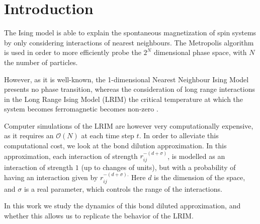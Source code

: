 \section{Introduction}%
\label{sec:Introduction}

The Ising model \cite{ising1925beitrag} is able to explain the spontaneous magnetization of spin systems by only considering interactions of nearest neighbours. The Metropolis \cite{Metropolis1953} algorithm is used in order to more efficiently probe the $2^N$ dimensional phase space, with $N$ the number of particles.

However, as it is well-known, the 1-dimensional Nearest Neighbour Ising Model presents no phase transition, whereas the consideration of long range interactions in the Long Range Ising Model (LRIM) the critical temperature at which the system becomes ferromagnetic becomes non-zero \cite{Janke2023}.

Computer simulations of the LRIM are however very computationally expensive, as it requires an $\mathcal{O}(N)$ at each time step $t $.  In order to alleviate this computational cost, we look at the bond dilution approximation. In this approximation, each interaction of strength $r_{ij}^{-(d + \sigma)}$, is modelled as an interaction of strength $1$ (up to changes of units), but with a probability of having an interaction given by  $r_{ij}^{-(d+ \sigma).}$ Here $d$ is the dimension of the space, and  $\sigma$ is a real parameter, which controls the range of the interactions.

In this work we study the dynamics of this bond diluted approximation, and whether this allows us to replicate the behavior of the LRIM.
